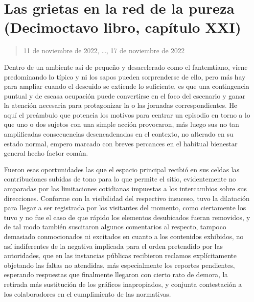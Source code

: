 \documentclass[
]{book}
\begin{document}
\hypertarget{las-grietas-en-la-red-de-la-pureza-decimoctavo-libro-capuxedtulo-xxi}{%
\section{Las grietas en la red de la pureza (Decimoctavo libro, capítulo XXI)}\label{las-grietas-en-la-red-de-la-pureza-decimoctavo-libro-capuxedtulo-xxi}}

\begin{quote}
11 de noviembre de 2022, \ldots, 17 de noviembre de 2022
\end{quote}

Dentro de un ambiente así de pequeño y desacelerado como el fantemtiano, viene predominando lo típico y ni los sapos pueden sorprenderse de ello, pero más hay para ampliar cuando el descuido se extiende lo suficiente, es que una contingencia puntual y de escasa ocupación puede convertirse en el foco del escenario y ganar la atención necesaria para protagonizar la o las jornadas correspondientes. He aquí el preámbulo que potencia los motivos para centrar un episodio en torno a lo que uno o dos sujetos con una simple acción provocaron, más luego sus no tan amplificadas consecuencias desencadenadas en el contexto, no alterado en su estado normal, empero marcado con breves percances en el habitual bienestar general hecho factor común.

Fueron esas oportunidades las que el espacio principal recibió en sus celdas las contribuciones subidas de tono para lo que permite el sitio, evidentemente no amparadas por las limitaciones cotidianas impuestas a los intercambios sobre sus direcciones. Conforme con la visibilidad del respectivo insuceso, tuvo la dilatación para llegar a ser registrada por los visitantes del momento, como ciertamente los tuvo y no fue el caso de que rápido los elementos desubicados fueran removidos, y de tal modo también suscitaron algunos comentarios al respecto, tampoco demasiado conmocionados ni excitados en cuanto a los contenidos exhibidos, no así indiferentes de la negativa implicada para el orden pretendido por las autoridades, que en las instancias públicas recibieron reclamos explícitamente objetando las faltas no atendidas, más especialmente los reportes pendientes, esperando respuestas que finalmente llegaron con cierto rato de demora, la retirada más sustitución de los gráficos inapropiados, y conjunta contestación a los colaboradores en el cumplimiento de las normativas.
\end{document}
